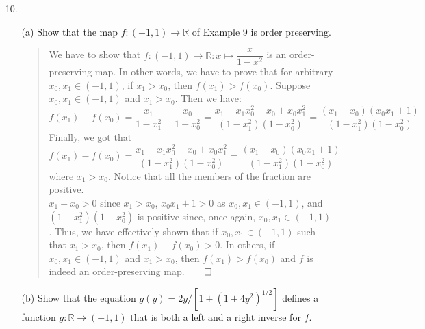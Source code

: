 \documentclass[12pt, a4paper]{article}
\newcommand{\reals}{\mathbb{R}} %
\newcommand{\rarr}{\rightarrow}
\begin{document}
\begin{itemize}
\item[10.]
\begin{itemize}
\item[(a)]
Show that the map $f : (-1, 1) \rarr \reals$ of Example 9 is order preserving.
\begin{quote}
We have to show that $f : (-1, 1) \rarr \reals : x \mapsto \dfrac{x}{1 - x^2}$ is
an order-preserving map. In other words, we have to prove that for arbitrary $x_0, x_1 \in (-1, 1)$,
if $x_1 > x_0$, then $f(x_1) > f(x_0)$. Suppose $x_0, x_1 \in (-1, 1)$ and $x_1 > x_0$.
Then we have:
$$f(x_1) - f(x_0) = \dfrac{x_1}{1 - x_1^2} - \dfrac{x_0}{1 - x_0^2} = \dfrac{x_1 - x_1x_0^2 - x_0 + x_0x_1^2}{(1 - x_1^2)(1 - x_0^2)} = \dfrac{(x_1 - x_0)(x_0x_1 + 1)}{(1 - x_1^2)(1 - x_0^2)}$$
\vspace{0.15cm}
Finally, we got that $f(x_1) - f(x_0) = \dfrac{x_1 - x_1x_0^2 - x_0 + x_0x_1^2}{(1 - x_1^2)(1 - x_0^2)} = \dfrac{(x_1 - x_0)(x_0x_1 + 1)}{(1 - x_1^2)(1 - x_0^2)}$
where $x_1 > x_0$. Notice that all the members of the fraction are positive.\\
$x_1 - x_0 > 0$ since $x_1 > x_0$, $x_0x_1 + 1 > 0$ as $x_0, x_1 \in (-1, 1)$, and $(1 - x_1^2)(1 - x_0^2)$ is positive
since, once again, $x_0, x_1 \in (-1, 1)$. Thus, we have effectively shown that if $x_0, x_1 \in (-1, 1)$ such that $x_1 > x_0$,
then $f(x_1) - f(x_0) > 0$. In others, if $x_0, x_1 \in (-1, 1)$ and $x_1 > x_0$, then $f(x_1) > f(x_0)$ and $f$ is indeed an order-preserving map.$\qed$
\end{quote}

\item[]

\item[(b)]
Show that the equation $g(y) = 2y / [1 + (1 + 4y^2)^{1/2}]$ defines a function
$g : \reals \rarr (-1, 1)$ that is both a left and a right inverse for $f$.


\end{itemize}
\end{itemize}
\end{document}

